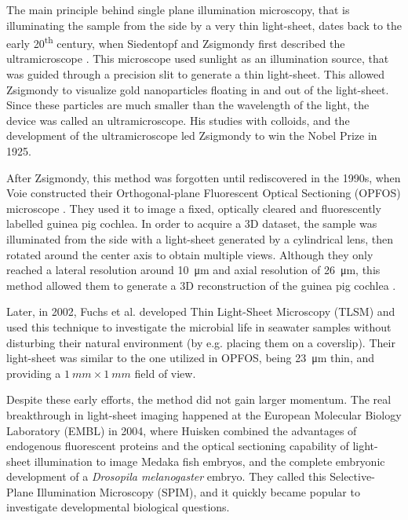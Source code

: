   

  The main principle behind single plane illumination microscopy, that is illuminating the sample from the side by a very thin light-sheet, dates back to the early 20\textsuperscript{th} century, when Siedentopf and Zsigmondy first described the ultramicroscope \cite{siedentopf_uber_1902}. This microscope used sunlight as an illumination source, that was guided through a precision slit to generate a thin light-sheet. This allowed Zsigmondy to visualize gold nanoparticles floating in and out of the light-sheet. Since these particles are much smaller than the wavelength of the light, the device was called an ultramicroscope. His studies with colloids, and the development of the ultramicroscope led Zsigmondy to win the Nobel Prize in 1925.

  After Zsigmondy, this method was forgotten until rediscovered in the 1990s, when Voie \etal constructed their Orthogonal-plane Fluorescent Optical Sectioning (OPFOS) microscope \cite{voie_orthogonal-plane_1993}. They used it to image a fixed, optically cleared and fluorescently labelled guinea pig cochlea. In order to acquire a 3D dataset, the sample was illuminated from the side with a light-sheet generated by a cylindrical lens, then rotated around the center axis to obtain multiple views. Although they only reached a lateral resolution around \SI{10}{\micro m} and axial resolution of \SI{26}{\micro m}, this method allowed them to generate a 3D reconstruction of the guinea pig cochlea \cite{voie_three-dimensional_1995}.

  Later, in 2002, Fuchs et al. developed Thin Light-Sheet Microscopy (TLSM) \cite{fuchs_thin_2002} and used this technique to investigate the microbial life in seawater samples without disturbing their natural environment (by e.g. placing them on a coverslip). Their light-sheet was similar to the one utilized in OPFOS, being \SI{23}{\micro m} thin, and providing a $\SI{1}{mm} \times \SI{1}{mm}$ field of view.

  Despite these early efforts, the method did not gain larger momentum. The real breakthrough in light-sheet imaging happened at the European Molecular Biology Laboratory (EMBL) in 2004, where Huisken \etal \cite{huisken_optical_2004} combined the advantages of endogenous fluorescent proteins and the optical sectioning capability of light-sheet illumination to image Medaka fish embryos, and the complete embryonic development of a \textit{Drosopila melanogaster} embryo. They called this Selective-Plane Illumination Microscopy (SPIM), and it quickly became popular to investigate developmental biological questions.

